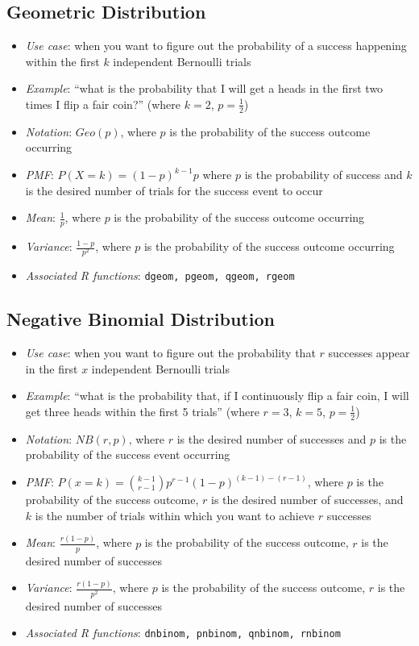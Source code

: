 \documentclass[12pt]{article}
\begin{document}
\subsection{Geometric Distribution}
\begin{itemize}
	\item \textit{Use case}: when you want to figure out the probability of a
	      success happening within the first $k$ independent Bernoulli trials
	\item \textit{Example}: ``what is the probability that I will get a heads
	      in the first two times I flip a fair coin?'' (where $k = 2$, $p = \frac{1}{2}$)
	\item \textit{Notation}: $Geo(p)$, where $p$ is the probability of the
	      success outcome occurring
	\item \textit{PMF}: $P(X = k) = (1-p)^{k-1}p$ where $p$ is the
	      probability of success and $k$ is the desired number of trials for the success event to occur
	\item \textit{Mean}: $\frac{1}{p}$, where $p$ is the probability of the success outcome occurring
	\item \textit{Variance}: $\frac{1-p}{p^2}$, where $p$ is the probability of the success outcome occurring
	\item \textit{Associated R functions}: \verb|dgeom, pgeom, qgeom, rgeom|
\end{itemize}
\subsection{Negative Binomial Distribution}
\begin{itemize}
	\item \textit{Use case}: when you want to figure out the probability that
	      $r$ successes appear in the first $x$ independent Bernoulli trials
	\item \textit{Example}: ``what is the probability that, if I continuously
	      flip a fair coin, I will get three heads within the first 5 trials'' (where
	      $r = 3$, $k = 5$, $p = \frac{1}{2}$)
	\item \textit{Notation}: $NB(r,p)$, where $r$ is the
	      desired number of successes and $p$ is the
	      probability of the success event occurring
	\item \textit{PMF}: $P(x = k) = {k-1\choose r-1} p^{r-1}(1-p)^{(k-1) - (r-1)}$, where $p$ is the
	      probability of the success outcome, $r$ is the desired number of
	      successes, and $k$ is the number of trials within which you want to
	      achieve $r$ successes
	\item \textit{Mean}: $\frac{r(1-p)}{p}$, where $p$ is the probability of
	      the success outcome, $r$ is the desired number of successes
	\item \textit{Variance}: $\frac{r(1-p)}{p^2}$, where $p$ is the probability of
	      the success outcome, $r$ is the desired number of successes
	\item \textit{Associated R functions}: \verb|dnbinom, pnbinom, qnbinom, rnbinom|
\end{itemize}
\end{document}
